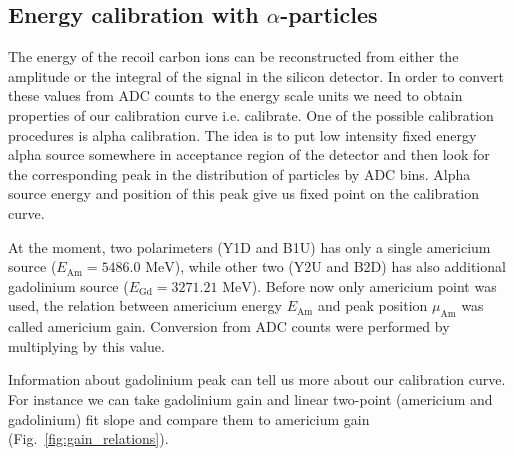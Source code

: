 \documentclass[a4paper,12pt]{article}
\begin{document}
\subsection{Energy calibration with $\alpha$-particles}

The energy of the recoil carbon ions can be reconstructed from either the
amplitude or the integral of the signal in the silicon detector. In order to
convert these values from ADC counts to the energy scale units we need to obtain
properties of our calibration curve i.e. calibrate. One of the possible
calibration procedures is alpha calibration. The idea is to put low intensity
fixed energy alpha source somewhere in acceptance region of the detector and
then look for the corresponding peak in the distribution of particles by ADC
bins. Alpha source energy and position of this peak give us fixed point on the
calibration curve.

At the moment, two polarimeters (Y1D and B1U) has only a single americium source
($E_{\text{Am}} = 5486.0\text{ MeV}$), while other two (Y2U and B2D) has also
additional gadolinium source ($E_{\text{Gd}} = 3271.21\text{ MeV}$). Before now
only americium point was used, the relation between americium energy
$E_{\text{Am}}$ and peak position $\mu_{\text{Am}}$ was called americium gain.
Conversion from ADC counts were performed by multiplying by this value.

Information about gadolinium peak can tell us more about our calibration curve.
For instance we can take gadolinium gain and linear two-point (americium and
gadolinium) fit slope and compare them to americium gain
(Fig.~\ref{fig:gain_relations}).
\end{document}
